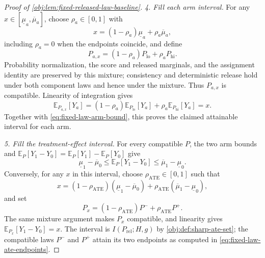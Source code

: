 \begin{proof}[Proof of \cref{obj:lem:fixed-released-law-baseline}]
\noindent\emph{4. Fill each arm interval.}
For any \(x\in[\underline\mu_a,\overline\mu_a]\), choose \(\rho_a\in[0,1]\) with
\[
x=(1-\rho_a)\underline\mu_a+\rho_a\overline\mu_a,
\]
including \(\rho_a=0\) when the endpoints coincide, and define
\[
P_{a,x}=(1-\rho_a)P_{\mathrm{lo}}+\rho_aP_{\mathrm{hi}}.
\]
Probability normalization, the score and released marginals, and the assignment identity are preserved by this mixture; consistency and deterministic release hold under both component laws and hence under the mixture. Thus \(P_{a,x}\) is compatible. Linearity of integration gives
\[
\mathbb E_{P_{a,x}}[Y_a]
=(1-\rho_a)\mathbb E_{P_{\mathrm{lo}}}[Y_a]
+\rho_a\mathbb E_{P_{\mathrm{hi}}}[Y_a]=x.
\]
Together with \cref{eq:fixed-law-arm-bound}, this proves the claimed attainable interval for each arm. %

\noindent\emph{5. Fill the treatment-effect interval.}
For every compatible \(P\), the two arm bounds and
\(\mathbb E_P[Y_1-Y_0]=\mathbb E_P[Y_1]-\mathbb E_P[Y_0]\) give
\[
\underline\mu_1-\overline\mu_0
\le\mathbb E_P[Y_1-Y_0]
\le\overline\mu_1-\underline\mu_0.
\]
Conversely, for any \(x\) in this interval, choose \(\rho_{\mathrm{ATE}}\in[0,1]\) such that
\[
x=(1-\rho_{\mathrm{ATE}})(\underline\mu_1-\overline\mu_0)
+\rho_{\mathrm{ATE}}(\overline\mu_1-\underline\mu_0),
\]
and set
\[
P_x=(1-\rho_{\mathrm{ATE}})P^-+\rho_{\mathrm{ATE}}P^+.
\]
The same mixture argument makes \(P_x\) compatible, and linearity gives
\(\mathbb E_{P_x}[Y_1-Y_0]=x\). The interval is \(I(P_{\mathrm{rel}};H,g)\) by \cref{obj:def:sharp-ate-set}; the compatible laws \(P^-\) and \(P^+\) attain its two endpoints as computed in \cref{eq:fixed-law-ate-endpoints}. %
\end{proof}
